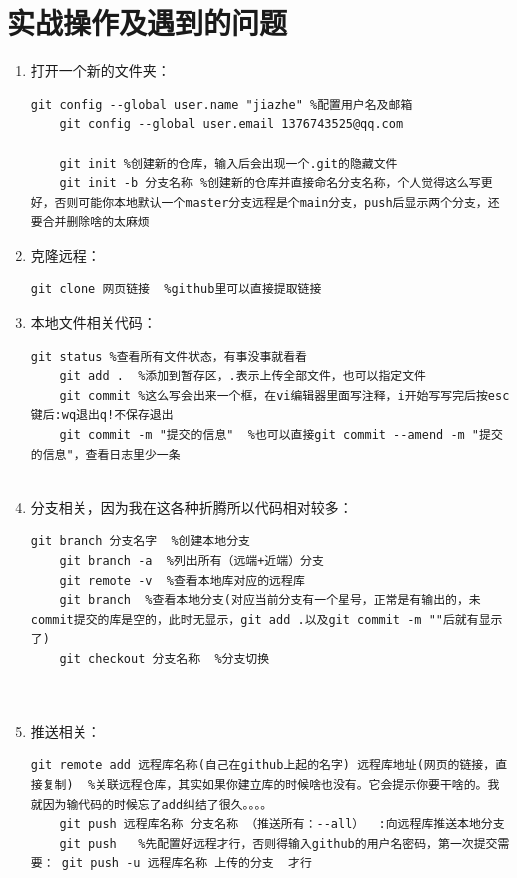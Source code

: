 \documentclass{article}
\begin{document}
\section{实战操作及遇到的问题}
\begin{enumerate}
\item 打开一个新的文件夹：
\begin{lstlisting}[breaklines=true]
	git config --global user.name "jiazhe" %配置用户名及邮箱
	git config --global user.email 1376743525@qq.com
	
	git init %创建新的仓库，输入后会出现一个.git的隐藏文件
	git init -b 分支名称 %创建新的仓库并直接命名分支名称，个人觉得这么写更好，否则可能你本地默认一个master分支远程是个main分支，push后显示两个分支，还要合并删除啥的太麻烦
\end{lstlisting}

\item 克隆远程：
\begin{lstlisting}[breaklines=true]
	git clone 网页链接  %github里可以直接提取链接
\end{lstlisting}	
	
\item 本地文件相关代码：
\begin{lstlisting}[breaklines=true]
	git status %查看所有文件状态，有事没事就看看
	git add .  %添加到暂存区，.表示上传全部文件，也可以指定文件
	git commit %这么写会出来一个框，在vi编辑器里面写注释，i开始写写完后按esc键后:wq退出q!不保存退出
	git commit -m "提交的信息"  %也可以直接git commit --amend -m "提交的信息"，查看日志里少一条
	
\end{lstlisting}	

\item 分支相关，因为我在这各种折腾所以代码相对较多：
\begin{lstlisting}[breaklines=true]
	git branch 分支名字  %创建本地分支
	git branch -a  %列出所有（远端+近端）分支
	git remote -v  %查看本地库对应的远程库
	git branch  %查看本地分支(对应当前分支有一个星号，正常是有输出的，未commit提交的库是空的，此时无显示，git add .以及git commit -m ""后就有显示了)
	git checkout 分支名称  %分支切换
	
				
\end{lstlisting}

\item 推送相关：
\begin{lstlisting}[breaklines=true]
	git remote add 远程库名称(自己在github上起的名字) 远程库地址(网页的链接，直接复制)  %关联远程仓库，其实如果你建立库的时候啥也没有。它会提示你要干啥的。我就因为输代码的时候忘了add纠结了很久。。。。
	git push 远程库名称 分支名称 （推送所有：--all）  :向远程库推送本地分支
	git push   %先配置好远程才行，否则得输入github的用户名密码，第一次提交需要： git push -u 远程库名称 上传的分支  才行
\end{lstlisting}


\end{enumerate}
\end{document}
